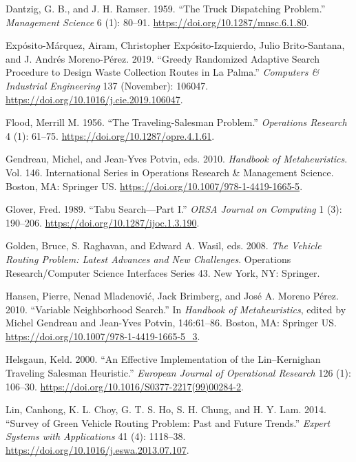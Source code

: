\documentclass[
]{article}
\begin{document}
\leavevmode\hypertarget{ref-dantzig_truck_1959}{}%
Dantzig, G. B., and J. H. Ramser. 1959. ``The Truck Dispatching
Problem.'' \emph{Management Science} 6 (1): 80--91.
\url{https://doi.org/10.1287/mnsc.6.1.80}.

\leavevmode\hypertarget{ref-exposito-marquez_greedy_2019}{}%
Expósito-Márquez, Airam, Christopher Expósito-Izquierdo, Julio
Brito-Santana, and J. Andrés Moreno-Pérez. 2019. ``Greedy Randomized
Adaptive Search Procedure to Design Waste Collection Routes in La
Palma.'' \emph{Computers \& Industrial Engineering} 137 (November):
106047. \url{https://doi.org/10.1016/j.cie.2019.106047}.

\leavevmode\hypertarget{ref-flood_traveling-salesman_1956}{}%
Flood, Merrill M. 1956. ``The Traveling-Salesman Problem.''
\emph{Operations Research} 4 (1): 61--75.
\url{https://doi.org/10.1287/opre.4.1.61}.

\leavevmode\hypertarget{ref-gendreau_handbook_2010}{}%
Gendreau, Michel, and Jean-Yves Potvin, eds. 2010. \emph{Handbook of
Metaheuristics}. Vol. 146. International Series in Operations Research
\& Management Science. Boston, MA: Springer US.
\url{https://doi.org/10.1007/978-1-4419-1665-5}.

\leavevmode\hypertarget{ref-glover_tabu_1989}{}%
Glover, Fred. 1989. ``Tabu Search---Part I.'' \emph{ORSA Journal on
Computing} 1 (3): 190--206. \url{https://doi.org/10.1287/ijoc.1.3.190}.

\leavevmode\hypertarget{ref-golden_vehicle_2008}{}%
Golden, Bruce, S. Raghavan, and Edward A. Wasil, eds. 2008. \emph{The
Vehicle Routing Problem: Latest Advances and New Challenges}. Operations
Research/Computer Science Interfaces Series 43. New York, NY: Springer.

\leavevmode\hypertarget{ref-gendreau_variable_2010}{}%
Hansen, Pierre, Nenad Mladenović, Jack Brimberg, and José A. Moreno
Pérez. 2010. ``Variable Neighborhood Search.'' In \emph{Handbook of
Metaheuristics}, edited by Michel Gendreau and Jean-Yves Potvin,
146:61--86. Boston, MA: Springer US.
\url{https://doi.org/10.1007/978-1-4419-1665-5_3}.

\leavevmode\hypertarget{ref-helsgaun_effective_2000}{}%
Helsgaun, Keld. 2000. ``An Effective Implementation of the
Lin--Kernighan Traveling Salesman Heuristic.'' \emph{European Journal of
Operational Research} 126 (1): 106--30.
\url{https://doi.org/10.1016/S0377-2217(99)00284-2}.

\leavevmode\hypertarget{ref-lin_survey_2014}{}%
Lin, Canhong, K. L. Choy, G. T. S. Ho, S. H. Chung, and H. Y. Lam. 2014.
``Survey of Green Vehicle Routing Problem: Past and Future Trends.''
\emph{Expert Systems with Applications} 41 (4): 1118--38.
\url{https://doi.org/10.1016/j.eswa.2013.07.107}.
\end{document}
